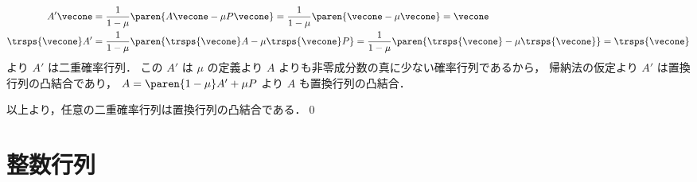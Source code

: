 \documentclass[a4paper]{jsarticle}
\begin{document}
{\begin{itemize}
        \begin{align*}
          A' \vecone
          &= \frac{1}{1 - \mu} \paren{A \vecone - \mu P \vecone}
          = \frac{1}{1 - \mu} \paren{\vecone - \mu \vecone}
          = \vecone
        \\
          \trsps{\vecone} A'
          &= \frac{1}{1 - \mu} \paren{\trsps{\vecone} A - \mu \trsps{\vecone} P}
          = \frac{1}{1 - \mu} \paren{\trsps{\vecone} - \mu \trsps{\vecone}}
          = \trsps{\vecone}
        \end{align*}
        より $A'$ は二重確率行列．
        この $A'$ は $\mu$ の定義より $A$ よりも非零成分数の真に少ない確率行列であるから，
        帰納法の仮定より $A'$ は置換行列の凸結合であり，
        $A = \paren{1 - \mu} A' + \mu P$ より $A$ も置換行列の凸結合．
      \end{itemize}
      以上より，任意の二重確率行列は置換行列の凸結合である．\qed
    }
\section{整数行列}
\end{document}
